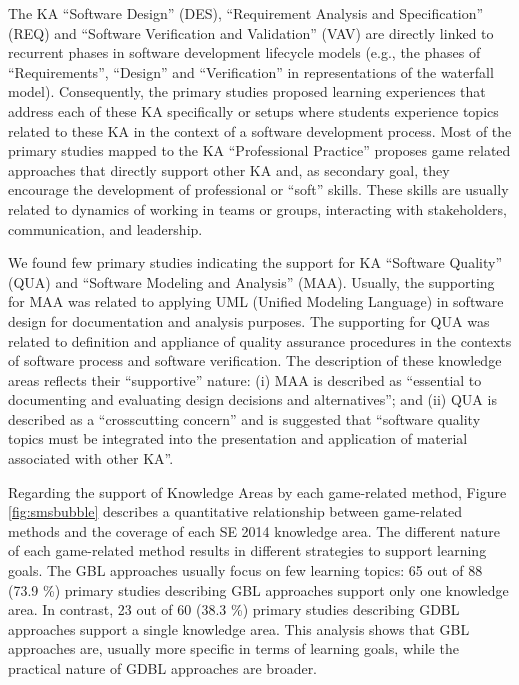 The KA “Software Design” (DES), “Requirement Analysis and Specification” (REQ) and “Software Verification and Validation” (VAV) are directly linked to recurrent phases in software development lifecycle models (e.g., the phases of “Requirements”, “Design” and “Verification” in representations of the waterfall model). Consequently, the primary studies proposed learning experiences that address each of these KA specifically or setups where students experience topics related to these KA in the context of a software development process. 	Most of the primary studies mapped to the KA “Professional Practice” proposes game related approaches that directly support other KA and, as secondary goal, they encourage the development of professional or “soft” skills. These skills are usually related to dynamics of working in teams or groups, interacting with stakeholders, communication, and leadership.

We found few primary studies indicating the support for KA “Software Quality” (QUA) and “Software Modeling and Analysis” (MAA). Usually, the supporting for MAA was related to applying UML (Unified Modeling Language) in software design for documentation and analysis purposes. The supporting for QUA was related to definition and appliance of quality assurance procedures in the contexts of software process and software verification. The description of these knowledge areas \citep{Acm:2015} reflects their “supportive” nature: (i) MAA is described as “essential to documenting and evaluating design decisions and alternatives”; and (ii) QUA is described as a “crosscutting concern” and is suggested that “software quality topics must be integrated into the presentation and application of material associated with other KA”. 

Regarding the support of Knowledge Areas by each game-related method, Figure \ref{fig:smsbubble} describes a quantitative relationship between game-related methods and the coverage of each SE 2014 knowledge area. The different nature of each game-related method results in different strategies to support learning goals. The GBL approaches usually focus on few learning topics: 65 out of 88 (73.9 \%) primary studies describing GBL approaches support only one knowledge area. In contrast, 23 out of 60 (38.3 \%) primary studies describing GDBL approaches support a single knowledge area. This analysis shows that GBL approaches are, usually more specific in terms of learning goals, while the practical nature of GDBL approaches are broader.

